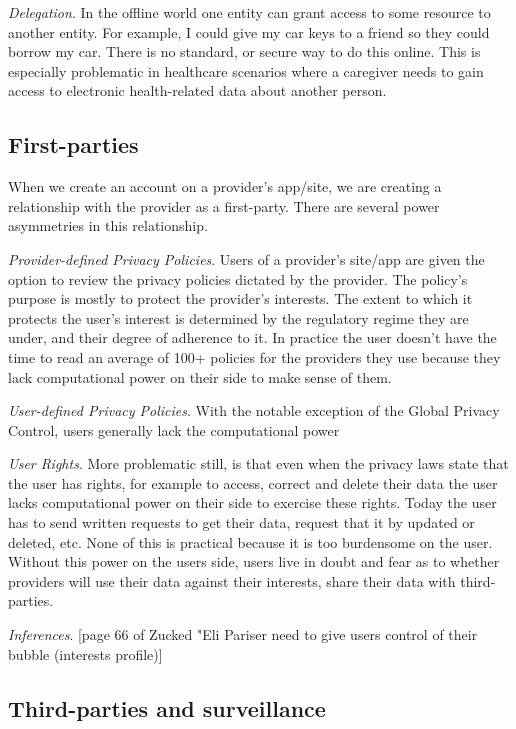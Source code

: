 \documentclass[11pt, oneside]{article}   	%
\begin{document}
\emph{Delegation}. In the offline world one entity can grant access to some resource to another entity. For example, I could give my car keys to a friend so they could borrow my car. There is no standard, or secure way to do this online. This is especially problematic in healthcare scenarios where a caregiver needs to gain access to electronic health-related data about another person.

\subsection{First-parties}

When we create an account on a provider's app/site, we are creating a relationship with the provider as a first-party. There are several power asymmetries in this relationship.

\emph{Provider-defined Privacy Policies}. Users of a provider's site/app are given the option to review the privacy policies dictated by the provider. The policy's purpose is mostly to protect the provider's interests. The extent to which it protects the user's interest is determined by the regulatory regime they are under, and their degree of adherence to it. In practice the user doesn't have the time to read an average of 100+ policies for the providers they use because they lack computational power on their side to make sense of them. 

\emph{User-defined Privacy Policies}. With the notable exception of the Global Privacy Control, users generally lack the computational power 

\emph{User Rights}. More problematic still, is that even when the privacy laws state that the user has rights, for example to access, correct and delete their data the user lacks computational power on their side to exercise these rights. Today the user has to send written requests to get their data, request that it by updated or deleted, etc. None of this is practical because it is too burdensome on the user. Without this power on the users side, users live in doubt and fear as to whether providers will use their data against their interests, share their data with third-parties.

\emph{Inferences}. [page 66 of Zucked "Eli Pariser need to give users control of their bubble (interests profile)]

\subsection{Third-parties and surveillance}
\end{document}
